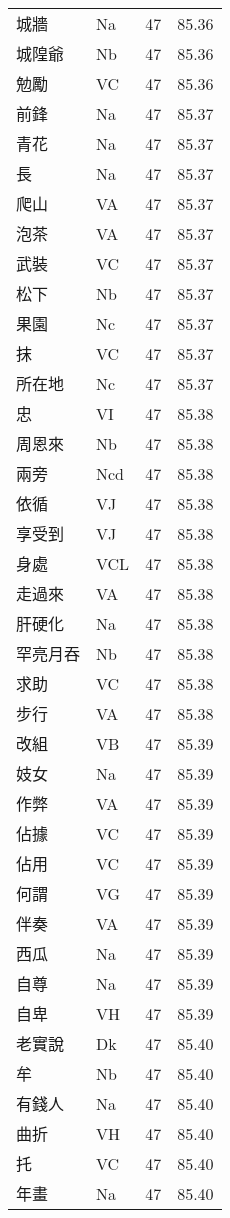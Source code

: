 \documentclass[twocolumn]{book}
\begin{document}
\begin{supertabular}{llrr}
城牆 & Na & 47 &  85.36\\
城隍爺 & Nb & 47 &  85.36\\
勉勵 & VC & 47 &  85.36\\
前鋒 & Na & 47 &  85.37\\
青花 & Na & 47 &  85.37\\
長 & Na & 47 &  85.37\\
爬山 & VA & 47 &  85.37\\
泡茶 & VA & 47 &  85.37\\
武裝 & VC & 47 &  85.37\\
松下 & Nb & 47 &  85.37\\
果園 & Nc & 47 &  85.37\\
抹 & VC & 47 &  85.37\\
所在地 & Nc & 47 &  85.37\\
忠 & VI & 47 &  85.38\\
周恩來 & Nb & 47 &  85.38\\
兩旁 & Ncd & 47 &  85.38\\
依循 & VJ & 47 &  85.38\\
享受到 & VJ & 47 &  85.38\\
身處 & VCL & 47 &  85.38\\
走過來 & VA & 47 &  85.38\\
肝硬化 & Na & 47 &  85.38\\
罕亮月吞 & Nb & 47 &  85.38\\
求助 & VC & 47 &  85.38\\
步行 & VA & 47 &  85.38\\
改組 & VB & 47 &  85.39\\
妓女 & Na & 47 &  85.39\\
作弊 & VA & 47 &  85.39\\
佔據 & VC & 47 &  85.39\\
佔用 & VC & 47 &  85.39\\
何謂 & VG & 47 &  85.39\\
伴奏 & VA & 47 &  85.39\\
西瓜 & Na & 47 &  85.39\\
自尊 & Na & 47 &  85.39\\
自卑 & VH & 47 &  85.39\\
老實說 & Dk & 47 &  85.40\\
牟 & Nb & 47 &  85.40\\
有錢人 & Na & 47 &  85.40\\
曲折 & VH & 47 &  85.40\\
托 & VC & 47 &  85.40\\
年畫 & Na & 47 &  85.40\\

\end{supertabular}
\end{document}
